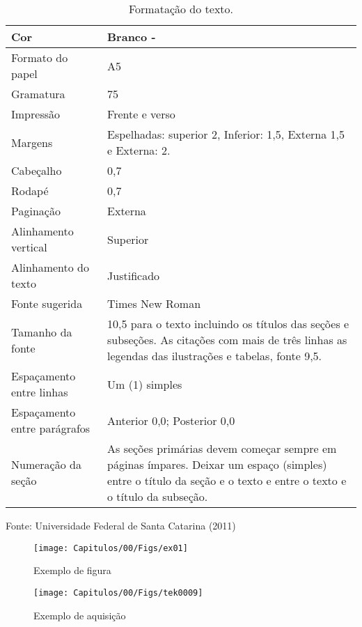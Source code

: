\begin{table}[!htb]
	\begin{center}
		\caption{Formatação do texto. \showfont}
		\label{tab:a}
		\begin{tabular}{ p{3cm} | p{6cm} }
			\hline
			Cor & Branco - \showfont\\ \hline
			Formato do papel & A5\\ \hline
			Gramatura & 75\\ \hline
			Impressão & Frente e verso\\ \hline
			Margens & Espelhadas: superior 2, Inferior: 1,5, Externa 1,5 e Externa: 2.\\ \hline
			Cabeçalho & 0,7\\ \hline
			Rodapé & 0,7\\ \hline
			Paginação & Externa\\ \hline
			Alinhamento vertical & Superior\\ \hline
			Alinhamento do texto & Justificado\\ \hline
			Fonte sugerida & Times New Roman \\ \hline
			Tamanho da fonte & 10,5 para o texto incluindo os títulos das seções e subseções. As citações com mais de três linhas as legendas das ilustrações e tabelas, fonte 9,5.\\ \hline
			Espaçamento entre linhas & Um (1) simples\\ \hline
			Espaçamento entre parágrafos & Anterior 0,0; Posterior 0,0\\ \hline
			Numeração da seção & As seções  primárias devem  começar  sempre em páginas ímpares. Deixar um espaço (simples) entre o título da seção e o texto e  entre o texto e o título da subseção. \\  \hline
		\end{tabular}
	\end{center}
	Fonte: Universidade Federal de Santa Catarina (2011) \showfont
\end{table}


\begin{figure}
\centering
\texttt{[image: Capitulos/00/Figs/ex01]}
\caption{Exemplo de figura}
\label{fig:ex01}
\end{figure}

\begin{figure}
\centering
\texttt{[image: Capitulos/00/Figs/tek0009]}
\caption{Exemplo de aquisição}
\label{fig:tek0009}
\end{figure}

